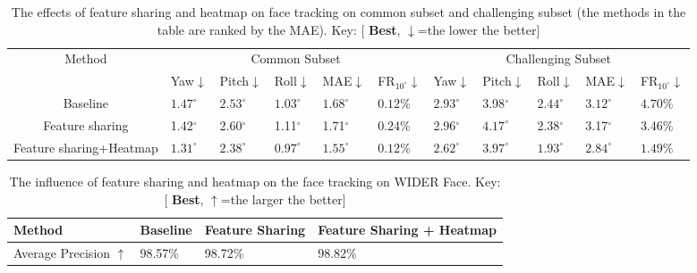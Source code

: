 \documentclass[3p,twocolumn, round, sort & compress]{elsarticle}
\begin{document}
\begin{table*}[t!]
	\centering
	\begin{tabular}{c|m{0.6cm}<{\centering}m{0.7cm}<{\centering}m{0.6cm}<{\centering}m{0.7cm}<{\centering}m{1.2cm}<{\centering}|m{0.6cm}<{\centering}m{0.7cm}<{\centering}m{0.6cm}<{\centering}m{0.7cm}<{\centering}m{1.2cm}<{\centering}}
		\hline
		\multirow{2}{*}{Method} & \multicolumn{5}{c|}{Common Subset}   & \multicolumn{5}{c}{Challenging Subset}  \\ \cline{2-11} 
		& Yaw$\downarrow$  & Pitch$\downarrow$ & Roll$\downarrow$ & MAE$\downarrow$  & FR$_{10^\circ}$$\downarrow$   & Yaw$\downarrow$   & Pitch$\downarrow$ & Roll$\downarrow$  & MAE$\downarrow$   & FR$_{10^\circ}$$\downarrow$   \\ \hline
		Baseline                    & $1.47^\circ$ & $2.53^\circ$  & $1.03^\circ$ & $1.68^\circ$ & $0.12\%$  & $2.93^\circ$  & 3.98$^\circ$  & $2.44^\circ$  & $3.12^\circ$  & $4.70\%$  \\
		Feature sharing & 1.42$^\circ$ & 2.60$^\circ$  & 1.11$^\circ$ & 1.71$^\circ$ & 0.24\%  & 2.96$^\circ$  & $4.17^\circ$  & 2.38$^\circ$  & 3.17$^\circ$  & 3.46\%  \\
		Feature sharing+Heatmap    & {\color{red} \textbf{$\bm{1.31^\circ}$}} & {\color{red} \textbf{$\bm{2.38^\circ}$}}  & {\color{red} \textbf{$\bm{0.97^\circ}$}} & {\color{red} \textbf{$\bm{1.55^\circ}$}} & {\color{red} \textbf{$\bm{0.12\%}$}} & {\color{red} \textbf{$\bm{2.62^\circ}$}} & {\color{red} \textbf{$\bm{3.97^\circ}$}} & {\color{red} \textbf{$\bm{1.93^\circ}$}} & {\color{red} \textbf{$\bm{2.84^\circ}$}} & {\color{red} \textbf{$\bm{1.49\%}$}} \\ \hline
	\end{tabular}
	\caption{The effects of feature sharing and heatmap on face tracking on common subset and challenging subset (the methods in the table are ranked by the MAE). Key: [{\color{red} \textbf{Best}}, $\downarrow$=the lower the better]}
	\label{Tabal9}
\end{table*}

\begin{table}[t!]
	\centering
	\begin{tabular}{m{1.6cm}<{\centering}|m{1.1cm}<{\centering}m{1.1cm}<{\centering}m{2.3cm}<{\centering}}
		\hline
		Method  & Baseline & Feature Sharing & Feature Sharing + Heatmap \\ \hline
		Average Precision $\uparrow$ & 98.57\%  & 98.72\% & {\color{red} \textbf{$\bm{98.82\%}$}} \\ \hline
	\end{tabular}
	\caption{The influence of feature sharing and heatmap on the face tracking on WIDER Face. Key: [{\color{red} \textbf{Best}}, $\uparrow$=the larger the better]}
	\label{Tabal8}
\end{table}
\end{document}
